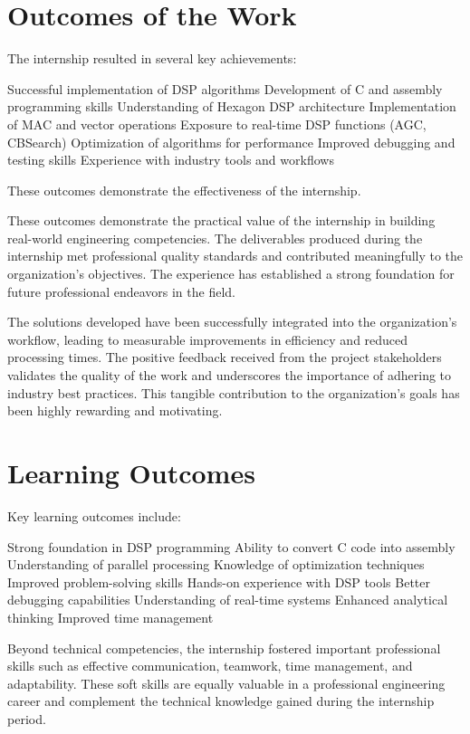 \documentclass[12pt,a4paper]{report}
\begin{document}
\section{Outcomes of the Work}

The internship resulted in several key achievements:


Successful implementation of DSP algorithms Development of C and assembly programming skills Understanding of Hexagon DSP architecture Implementation of MAC and vector operations Exposure to real-time DSP functions (AGC, CBSearch) Optimization of algorithms for performance Improved debugging and testing skills Experience with industry tools and workflows


These outcomes demonstrate the effectiveness of the internship.


These outcomes demonstrate the practical value of the internship in building real-world engineering competencies. The deliverables produced during the internship met professional quality standards and contributed meaningfully to the organization's objectives. The experience has established a strong foundation for future professional endeavors in the field.


The solutions developed have been successfully integrated into the organization's workflow, leading to measurable improvements in efficiency and reduced processing times. The positive feedback received from the project stakeholders validates the quality of the work and underscores the importance of adhering to industry best practices. This tangible contribution to the organization's goals has been highly rewarding and motivating.


\section{Learning Outcomes}

Key learning outcomes include:


Strong foundation in DSP programming Ability to convert C code into assembly Understanding of parallel processing Knowledge of optimization techniques Improved problem-solving skills Hands-on experience with DSP tools Better debugging capabilities Understanding of real-time systems Enhanced analytical thinking Improved time management


Beyond technical competencies, the internship fostered important professional skills such as effective communication, teamwork, time management, and adaptability. These soft skills are equally valuable in a professional engineering career and complement the technical knowledge gained during the internship period.
\end{document}
